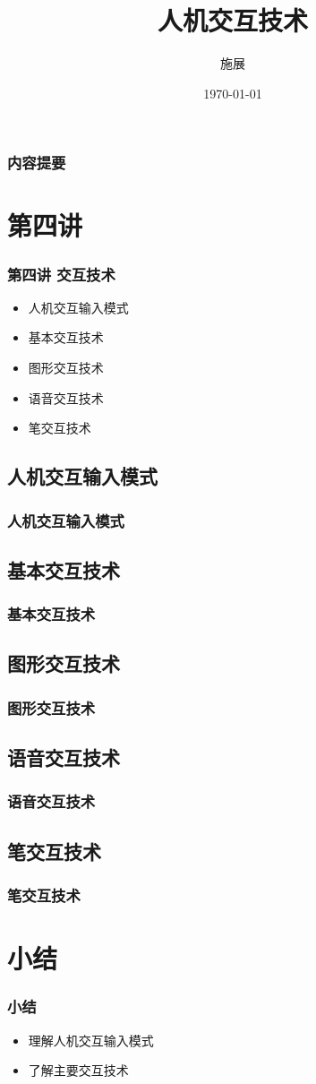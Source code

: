 \documentclass{beamer}
\title{人机交互技术}
\author{施展}
\institute{华中科技大学~武汉光电国家实验室}
\date{\today}
\begin{document}
\begin{frame}
	\frametitle{内容提要}
	\titlepage
\end{frame}

\begin{frame}
	\tableofcontents
\end{frame}

\section{第四讲}
\begin{frame}
	\frametitle{第四讲 交互技术}
	\begin{itemize}
		\item 人机交互输入模式
		\item 基本交互技术
		\item 图形交互技术
		\item 语音交互技术
		\item 笔交互技术
	\end{itemize}
\end{frame}

\subsection{人机交互输入模式}
\begin{frame}
	\frametitle{人机交互输入模式}

\end{frame}

\subsection{基本交互技术}
\begin{frame}
	\frametitle{基本交互技术}

\end{frame}

\subsection{图形交互技术}
\begin{frame}
	\frametitle{图形交互技术}

\end{frame}

\subsection{语音交互技术}
\begin{frame}
	\frametitle{语音交互技术}

\end{frame}

\subsection{笔交互技术}
\begin{frame}
	\frametitle{笔交互技术}

\end{frame}

\section{小结}
\begin{frame}
	\frametitle{小结}
	\begin{itemize}
		\item 理解人机交互输入模式
		\item 了解主要交互技术
	\end{itemize}
\end{frame}
 
\end{document}
